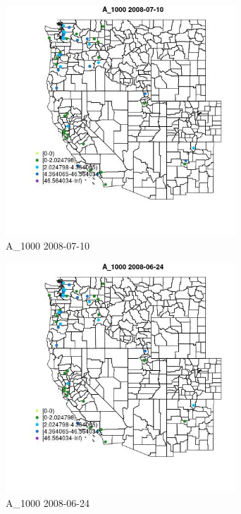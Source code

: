 \begin{figure} 
\centering  
\includegraphics[width=0.77\textwidth]{Code_Outputs/Report_ML_input_PM25_Step4_part_e_de_duplicated_aves_MapObsA_10002008-07-10.jpg} 
\caption{\label{fig:Report_ML_input_PM25_Step4_part_e_de_duplicated_avesMapObsA_10002008-07-10}A_1000 2008-07-10} 
\end{figure} 
 

\begin{figure} 
\centering  
\includegraphics[width=0.77\textwidth]{Code_Outputs/Report_ML_input_PM25_Step4_part_e_de_duplicated_aves_MapObsA_10002008-06-24.jpg} 
\caption{\label{fig:Report_ML_input_PM25_Step4_part_e_de_duplicated_avesMapObsA_10002008-06-24}A_1000 2008-06-24} 
\end{figure} 
 

